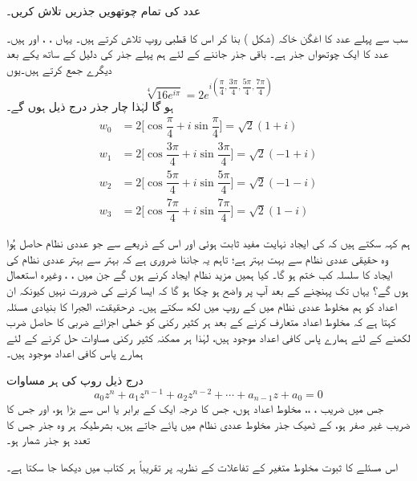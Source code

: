 عدد  کی تمام  چوتھویں جذریں  تلاش کریں۔

سب سے پہلے  عدد  کا  اغگن خاکہ (شکل ) بنا کر اس کا  قطبی روپ   تلاش کرتے ہیں۔ یہاں ، ، اور  ہیں۔ عدد  کا  ایک  چوتھواں جذر  ہے۔ باقی جذر جاننے کے  لئے  ہم  پہلے جذر کی  دلیل کے ساتھ یکے بعد دیگرے  جمع کرتے ہیں۔یوں 
\[\sqrt[4]{16e^{i\pi}}=2e^{i(\dfrac{\pi}{4}, \dfrac{3\pi}{4}, \dfrac{5\pi}{4}, \dfrac{7\pi}{4})}\]
ہو گا لہٰذا چار جذر درج ذیل ہوں گے۔
\begin{align*}
w_0&=2\big[\cos\dfrac{\pi}{4}+i\sin\dfrac{\pi}{4}\big]=\sqrt{2}(1+i)\\
w_1&=2\big[\cos\dfrac{3\pi}{4}+i\sin\dfrac{3\pi}{4}\big]=\sqrt{2}(-1+i)\\
w_2&=2\big[\cos\dfrac{5\pi}{4}+i\sin\dfrac{5\pi}{4}\big]=\sqrt{2}(-1-i)\\
w_3&=2\big[\cos\dfrac{7\pi}{4}+i\sin\dfrac{7\pi}{4}\big]=\sqrt{2}(1-i)
\end{align*}


ہم  کہہ سکتے ہیں کہ  کی ایجاد  نہایت مفید ثابت ہوئی اور اس کے ذریعے   سے جو عددی نظام حاصل ہُوا وہ حقیقی عددی نظام سے بہت بہتر ہے؛ تاہم یہ جاننا ضروری ہے کہ   بہتر سے بہتر  عددی نظام کی ایجاد کا سلسلہ کب ختم ہو گا۔ کیا ہمیں مزید نظام ایجاد کرنے ہوں گے جن میں ، ، وغیرہ استعمال ہوں گے؟ یہاں تک پہنچنے کے بعد آپ پر واضح ہو چکا ہو گا کہ ایسا کرنے کی ضرورت نہیں کیونکہ  ان اعداد کو ہم مخلوط عددی نظام  میں  کے روپ میں لکھ سکتے ہیں۔ درحقیقت، الجبرا کا بنیادی  مسئلہ کہتا ہے کہ مخلوط اعداد متعارف کرنے کے بعد ہر کثیر رکنی کو خطی  اجزائے ضربی  کا حاصل ضرب لکھنے کے لئے   ہمارے پاس  کافی اعداد موجود   ہیں، لہٰذا ہر ممکنہ کثیر رکنی مساوات حل کرنے کے لئے ہمارے   پاس کافی اعداد موجود  ہیں۔ 

درج ذیل روپ کی ہر مساوات
\[a_0z^n+a_1z^{n-1}+a_2z^{n-2}+\cdots+a_{n-1}z+a_0=0\]
جس میں ضریب  ، ،،  مخلوط اعداد ہوں، جس  کا درجہ   ایک کے برابر یا اس سے بڑا ہو، اور جس کا ضریب   غیر صفر ہو، کے ٹھیک  جذر  مخلوط عددی نظام میں پائے جاتے ہیں، بشرطیکہ ہر وہ  جذر  جس کا تعدد  ہو   جذر شمار ہو۔

اس مسئلے کا ثبوت مخلوط متغیر کے تفاعلات کے نظریہ پر   تقریباً ہر کتاب میں دیکھا جا سکتا ہے۔

